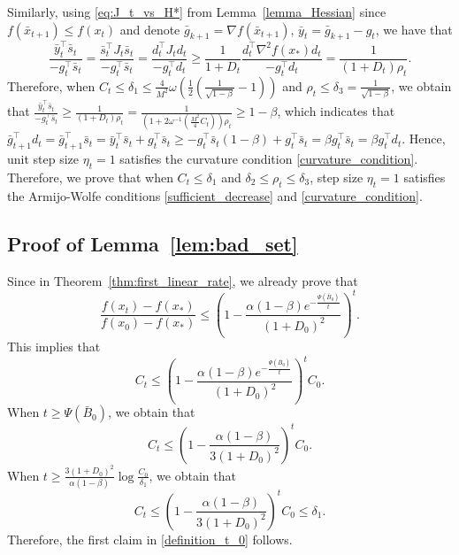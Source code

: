 \documentclass[11pt,letterpaper]{article}
\newcommand\0{{\Vector{0}}}
\newcommand\1{{\Vector{1}}}
\numberwithin{assumption}{section}
\numberwithin{definition}{section}
\numberwithin{theorem}{section}
\numberwithin{remark}{section}
\begin{document}
    Similarly, using \eqref{eq:J_t_vs_H*} from Lemma~\ref{lemma_Hessian} since $f(\bar{x}_{t + 1}) \leq f(x_t)$ and denote $\bar{g}_{k + 1} = \nabla{f}(\bar{x}_{t + 1})$, $\bar{y}_t = \bar{g}_{k + 1} - g_t$, we have that
    \begin{equation*}%
    \frac{\bar{y}_t^\top \bar{s}_t}{-g_t^\top \bar{s}_t} = \frac{\bar{s}_t^\top J_t \bar{s}_t}{-g_t^\top \bar{s}_t} = \frac{d_t^\top J_t d_t}{-g_t^\top d_t} \geq \frac{1}{1 + D_t}\frac{d_t^\top \nabla^2{f(x_*)}d_t}{-g_t^\top d_t} = \frac{1}{(1 + D_t)\rho_t}.
    \end{equation*}
    Therefore, when $C_t \leq \delta_1 \leq \frac{4}{M^2}\omega(\frac{1}{2}(\frac{1}{\sqrt{1 - \beta}} - 1))$ and $\rho_t \leq \delta_3 = \frac{1}{\sqrt{1 - \beta}}$, we obtain that $\frac{\bar{y}_t^\top \bar{s}_t}{-g_t^\top \bar{s}_t} \geq \frac{1}{(1 + D_t)\rho_t} = \frac{1}{(1 + 2\omega^{-1}(\frac{M^2}{4}C_t))\rho_t} \geq 1 - \beta$, which indicates that $\bar{g}_{t + 1}^\top d_t = \bar{g}_{t + 1}^\top \bar{s}_t = \bar{y}_t^\top \bar{s}_t + g_{t}^\top \bar{s}_t \geq -g_{t}^\top \bar{s}_t(1 -\beta) + g_{t}^\top \bar{s}_t = \beta g_{t}^\top \bar{s}_t = \beta g_{t}^\top d_t$. Hence, unit step size $\eta_t = 1$ satisfies the curvature condition \eqref{curvature_condition}. Therefore, we prove that when $C_t \leq \delta_1$ and $\delta_2 \leq \rho_t \leq \delta_3$, step size $\eta_t = 1$ satisfies the Armijo-Wolfe conditions \eqref{sufficient_decrease} and \eqref{curvature_condition}.

\subsection{Proof of Lemma~\ref{lem:bad_set}}\label{proof_lem:bad_set}

Since in Theorem~\ref{thm:first_linear_rate}, we already prove that
\begin{equation*}
    \frac{f(x_t) - f(x_*)}{f(x_0) - f(x_*)} \leq \left(1 - \frac{\alpha(1 - \beta)e^{-\frac{\Psi(\bar{B}_0)}{t}}}{(1 + D_0)^2}\right)^{t}.
\end{equation*}
This implies that
\begin{equation*}
    C_t \leq \left(1 - \frac{\alpha(1 - \beta)e^{-\frac{\Psi(\bar{B}_0)}{t}}}{(1 + D_0)^2}\right)^{t}C_0.
\end{equation*}
When $t \geq \Psi(\bar{B}_0)$, we obtain that
\begin{equation*}
    C_t \leq \left(1 - \frac{\alpha(1 - \beta)}{3(1 + D_0)^2}\right)^{t}C_0.
\end{equation*}
When $t \geq \frac{3(1 + D_0)^2}{\alpha(1 - \beta)}\log{\frac{C_0}{\delta_1}}$, we obtain that
\begin{equation*}
    C_t \leq \left(1 - \frac{\alpha(1 - \beta)}{3(1 + D_0)^2}\right)^{t}C_0 \leq \delta_1.
\end{equation*}
Therefore, the first claim in \eqref{definition_t_0} follows.
    
\end{document}
